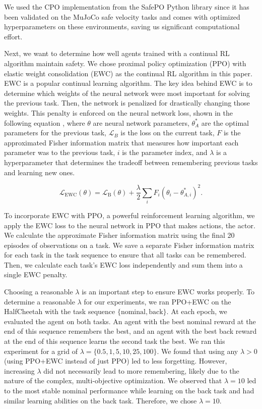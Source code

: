 We used the CPO implementation from the SafePO \cite{ji2023safety} Python library since it has been validated on the MuJoCo safe velocity tasks and comes with optimized hyperparameters on these environments, saving us significant computational effort.  

Next, we want to determine how well agents trained with a continual RL algorithm maintain safety. We chose proximal policy optimization (PPO) with elastic weight consolidation (EWC) \cite{kirkpatrick2017overcoming} as the continual RL algorithm in this paper. EWC is a popular continual learning algorithm. The key idea behind EWC is to determine which weights of the neural network were most important for solving the previous task. Then, the network is penalized for drastically changing those weights. This penalty is enforced on the neural network loss, shown in the following equation \cite{kirkpatrick2017overcoming}, where $\theta$ are neural network parameters, $\theta^*_A$ are the optimal parameters for the previous task, $\mathcal{L}_B$ is the loss on the current task, $F$ is the approximated Fisher information matrix that measures how important each parameter was to the previous task, $i$ is the parameter index, and $\lambda$ is a hyperparameter that determines the tradeoff between remembering previous tasks and learning new ones.

\begin{equation}
\mathcal{L}_{\text{EWC}}(\theta) = \mathcal{L}_{\text{B}}(\theta) + \frac{\lambda}{2} \sum_{i} F_{i} \left( \theta_{i} - \theta_{A, i}^{*} \right)^2.
\end{equation}

To incorporate EWC with PPO, a powerful reinforcement learning algorithm, we apply the EWC loss to the neural network in PPO that makes actions, the actor. We calculate the approximate Fisher information matrix using the final 20 episodes of observations on a task. We save a separate Fisher information matrix for each task in the task sequence to ensure that all tasks can be remembered. Then, we calculate each task's EWC loss independently and sum them into a single EWC penalty.

Choosing a reasonable $\lambda$ is an important step to ensure EWC works properly. To determine a reasonable $\lambda$ for our experiments, we ran PPO+EWC on the HalfCheetah with the task sequence $\{\text{nominal}, \text{back}\}$. At each epoch, we evaluated the agent on both tasks. An agent with the best nominal reward at the end of this sequence remembers the best, and an agent with the best back reward at the end of this sequence learns the second task the best. We ran this experiment for a grid of $\lambda=\{0.5, 1, 5, 10, 25, 100\}$. We found that using any $\lambda > 0$ (using PPO+EWC instead of just PPO) led to less forgetting. However, increasing $\lambda$ did not necessarily lead to more remembering, likely due to the nature of the complex, multi-objective optimization. We observed that $\lambda=10$ led to the most stable nominal performance while learning on the back task and had similar learning abilities on the back task. Therefore, we chose $\lambda=10$.


